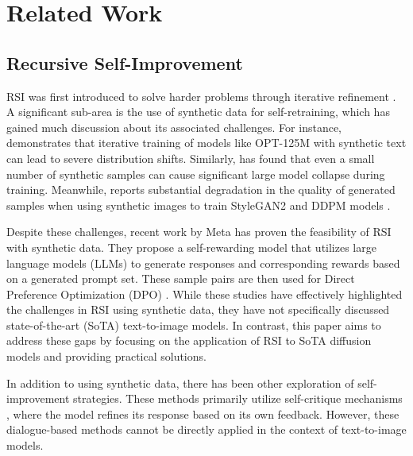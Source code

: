 \section{Related Work}
\subsection{Recursive Self-Improvement}
RSI was first introduced to solve harder problems through iterative refinement \cite{schmidhuber2003godel}.
%
A significant sub-area is the use of synthetic data for self-retraining, which has gained much discussion about its associated challenges.
%
For instance, \cite{shumailov2024ai} demonstrates that iterative training of models like OPT-125M \cite{zhang2022opt} with synthetic text can lead to severe distribution shifts.
%
Similarly, \cite{dohmatob2024strong} has found that even a small number of synthetic samples can cause significant large model collapse during training.
%
Meanwhile, \cite{alemohammad2023self} reports substantial degradation in the quality of generated samples when using synthetic images to train StyleGAN2 \cite{karras2020analyzing} and DDPM models \cite{ho2020denoising}.

Despite these challenges, recent work by Meta \cite{yuan2024self} has proven the feasibility of RSI with synthetic data. They propose a self-rewarding model that utilizes large language models (LLMs) to generate responses and corresponding rewards based on a generated prompt set. These sample pairs are then used for Direct Preference Optimization (DPO) \cite{rafailov2024direct}.
%
While these studies have effectively highlighted the challenges in RSI using synthetic data, they have not specifically discussed state-of-the-art (SoTA) text-to-image models.
%
In contrast, this paper aims to address these gaps by focusing on the application of RSI to SoTA diffusion models and providing practical solutions.

In addition to using synthetic data, there has been other exploration of self-improvement strategies. 
%
These methods primarily utilize self-critique mechanisms \cite{madaan2024self,chen2023teaching,welleckgenerating,han2024small,miao2023selfcheck}, where the model refines its response based on its own feedback. 
%
However, these dialogue-based methods cannot be directly applied in the context of text-to-image models.

